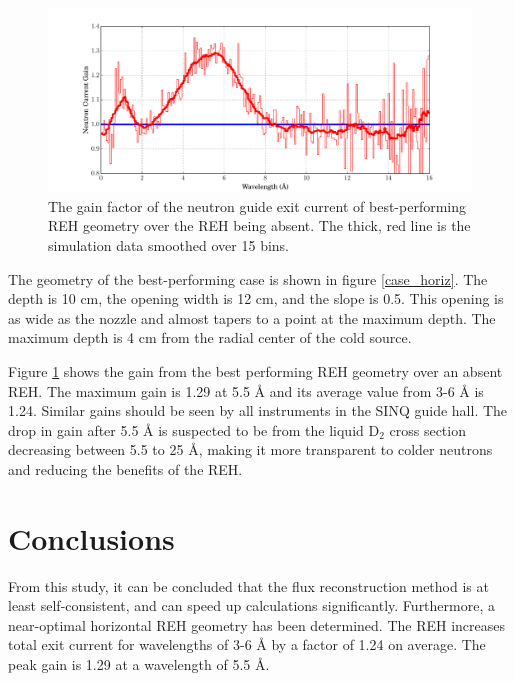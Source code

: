 \documentclass[preprint,12pt]{elsarticle}
\begin{document}
\begin{figure}
\begin{center}
\includegraphics[scale=0.45,trim={0cm 0cm 0cm 0cm},clip]{graphics/parametric_gain.pdf}
\end{center}
\caption{\label{parametric_gain}The gain factor of the neutron guide exit current of best-performing REH geometry over the REH being absent.  The thick, red line is the simulation data smoothed over 15 bins.}
\end{figure}

The geometry of the best-performing case is shown in figure \ref{case_horiz}.  The depth is 10 cm, the opening width is 12 cm, and the slope is 0.5.  This opening is as wide as the nozzle and almost tapers to a point at the maximum depth.  The maximum depth is 4 cm from the radial center of the cold source.  

Figure \ref{parametric_gain} shows the gain from the best performing REH geometry over an absent REH.  The maximum gain is 1.29 at 5.5 \AA{} and its average value from 3-6 \AA{} is 1.24.  Similar gains should be seen by all instruments in the SINQ guide hall.  The drop in gain after 5.5 \AA{} is suspected to be from the liquid D$_2$ cross section decreasing between 5.5 to 25 \AA{}, making it more transparent to colder neutrons and reducing the benefits of the REH.

\newpage
\section{Conclusions}

From this study, it can be concluded that the flux reconstruction method is at least self-consistent, and can speed up calculations significantly.  Furthermore, a near-optimal horizontal REH geometry has been determined.  The REH increases total exit current for wavelengths of 3-6 \AA{} by a factor of 1.24 on average. The peak gain is 1.29 at a wavelength of 5.5 \AA{}.
\end{document}
